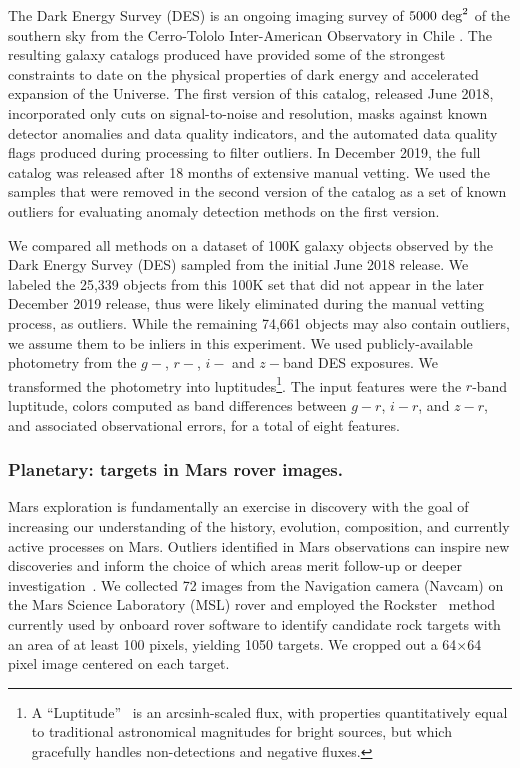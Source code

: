 \documentclass[letterpaper]{article} %
\begin{document}
The Dark Energy Survey (DES) is an ongoing imaging survey of
$5000~{\rm deg}^2$ of the southern sky from the Cerro-Tololo
Inter-American Observatory in Chile \cite{DESY1}. The resulting galaxy catalogs produced have provided some of the strongest constraints to date on
the physical properties of dark energy and accelerated expansion
of the Universe. The first version of this catalog, released June 2018, incorporated
only cuts on signal-to-noise and resolution, masks against known detector
anomalies and data quality indicators, and the automated data quality
flags produced during processing to filter outliers. 
In December 2019, the full catalog
was released after 18 months of extensive manual vetting. We used the samples 
that were removed in the second version of the catalog as a set of known
outliers for evaluating anomaly detection methods on the first version.

We compared all methods on a dataset of 100K galaxy objects
observed by the Dark Energy Survey (DES) sampled from the initial June 2018 release.
We labeled the 25,339 objects from this 100K set that did not appear in the later December 2019
release, thus were likely eliminated during the manual vetting process, 
as outliers.
While the remaining 74,661 objects may also contain outliers, we assume them to be inliers in this experiment. We used publicly-available photometry from the $g-$, $r-$, $i-$ and $z-$band DES exposures.  We
transformed the photometry into luptitudes\footnote{A
  ``Luptitude''~\cite{lupton99} is an arcsinh-scaled flux, with
  properties quantitatively equal to
  traditional astronomical magnitudes for bright sources, but which
  gracefully handles non-detections and negative fluxes.}.  The input features 
  were the $r$-band luptitude, colors computed as band differences between
$g-r$, $i-r$, and $z-r$, and associated observational errors, for a total of eight features.
%


\subsubsection{Planetary: targets in Mars rover images.}
Mars exploration is fundamentally an exercise in discovery with the
goal of increasing our understanding of the history, evolution,
composition, and currently active processes on Mars.  Outliers
identified in Mars observations can inspire new discoveries and inform
the choice of which areas merit follow-up or deeper
investigation~\cite{kerner2020comparison,wagstaff:rover-novelty20}.
We collected \num{72} images from the Navigation camera (Navcam) 
on the Mars Science Laboratory (MSL) rover
and employed the Rockster~\cite{burl:rockster16}
method currently used by onboard rover software to identify candidate rock
targets with an area of at least 100 pixels, yielding \num{1050}
targets.  We cropped out a \num{64}$\times$\num{64} pixel image
centered on each target.
\end{document}
